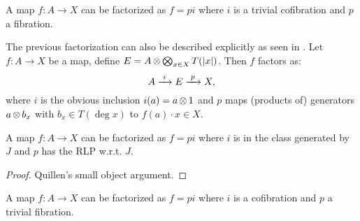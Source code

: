 \begin{corollary}
	[MC5a] A map $f: A \to X$ can be factorized as $f = pi$ where $i$ is a trivial cofibration and $p$ a fibration.
\end{corollary}

The previous factorization can also be described explicitly as seen in \cite{bousfield}. Let $f: A \to X$ be a map, define $E = A \operatorname*{\otimes} \operatorname*{\bigotimes}_{x \in X}T({|{x}|})$. Then $f$ factors as:
$$ A \xrightarrow{\,\,{i}\,\,} E \xrightarrow{\,\,{p}\,\,} X, $$
where $i$ is the obvious inclusion $i(a) = a \operatorname*{\otimes} 1$ and $p$ maps (products of) generators $a \operatorname*{\otimes} b_x$ with $b_x \in T(\deg{x})$ to $f(a) \cdot x \in X$.

\begin{lemma}
	A map $f: A \to X$ can be factorized as $f = pi$ where $i$ is in the class generated by $J$ and $p$ has the RLP w.r.t. $J$.
\end{lemma}
\begin{proof}
	Quillen's small object argument.
\end{proof}

\begin{corollary}
	[MC5b] A map $f: A \to X$ can be factorized as $f = pi$ where $i$ is a cofibration and $p$ a trivial fibration.
\end{corollary}

\begin{lemma}
	[MC4]
\end{lemma}
